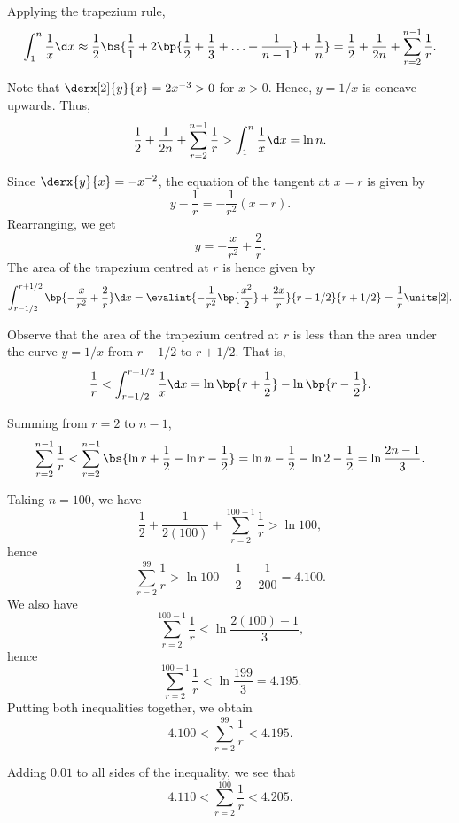 \begin{solution}
    \begin{ppart}
        Applying the trapezium rule, \[\int_1^n \frac1x \d x \approx \frac12 \bs{\frac11 + 2\bp{\frac12 + \frac13 + \ldots + \frac1{n-1}} + \frac1n} = \frac12 + \frac1{2n} + \sum_{r=2}^{n-1} \frac1r.\]

        Note that $\derx[2]{y}{x} = 2x^{-3} > 0$ for $x > 0$. Hence, $y = 1/x$ is concave upwards. Thus, \[\frac12 + \frac1{2n} + \sum_{r=2}^{n-1} \frac1r > \int_1^n \frac1x \d x = \ln n.\]
    \end{ppart}
    \begin{ppart}
        Since $\derx{y}{x} = -x^{-2}$, the equation of the tangent at $x = r$ is given by \[y - \frac1r = -\frac1{r^2} (x - r).\] Rearranging, we get \[y = -\frac{x}{r^2} + \frac2r.\] The area of the trapezium centred at $r$ is hence given by \[\int_{r-1/2}^{r + 1/2} \bp{-\frac{x}{r^2} + \frac2r} \d x = \evalint{-\frac1{r^2} \bp{\frac{x^2}2} + \frac{2x}r}{r-1/2}{r + 1/2} = \frac1r \units[2].\]

        Observe that the area of the trapezium centred at $r$ is less than the area under the curve $y = 1/x$ from $r - 1/2$ to $r + 1/2$. That is, \[\frac1r < \int_{r - 1/2}^{r + 1/2} \frac1x \d x = \ln\bp{r + \frac12} - \ln\bp{r - \frac12}.\]

        Summing from $r = 2$ to $n-1$, \[\sum_{r = 2}^{n-1} \frac1r < \sum_{r=2}^{n-1} \bs{\ln{r + \frac12} - \ln{r - \frac12}} = \ln{n - \frac12} - \ln{2 - \frac12} = \ln{\frac{2n - 1}{3}}.\]
    \end{ppart}
    \begin{ppart}
        Taking $n = 100$, we have \[\frac12 + \frac1{2 (100)} + \sum_{r=2}^{100 - 1} \frac1{r} > \ln 100,\] hence \[\sum_{r=2}^{99} \frac1{r} > \ln 100 - \frac12 - \frac1{200} = 4.100.\] We also have \[\sum_{r = 2}^{100 - 1} \frac1r <\ln{\frac{2 (100) - 1}{3}},\] hence \[\sum_{r = 2}^{100 - 1} \frac1r < \ln{\frac{199}3} = 4.195.\] Putting both inequalities together, we obtain \[4.100 < \sum_{r = 2}^{99} \frac1r < 4.195.\]

        Adding $0.01$ to all sides of the inequality, we see that \[4.110 < \sum_{r = 2}^{100} \frac1r < 4.205.\]
    \end{ppart}
\end{solution}